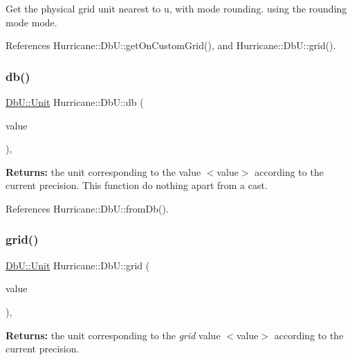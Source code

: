 Get the physical grid unit nearest to {\ttfamily u}, with {\ttfamily mode} rounding. using the rounding mode {\ttfamily mode}. 

References Hurricane\+::\+Db\+U\+::get\+On\+Custom\+Grid(), and Hurricane\+::\+Db\+U\+::grid().

\mbox{\label{group__DbUGroup_gacd77957381fb93fc4203bdca215e0b48}} 
\subsubsection{\texorpdfstring{db()}{db()}}
{\footnotesize\ttfamily \hyperlink{group__DbUGroup_ga4fbfa3e8c89347af76c9628ea06c4146}{Db\+U\+::\+Unit} Hurricane\+::\+Db\+U\+::db (\begin{DoxyParamCaption}\item[{\hyperlink{group__DbUGroup_ga4fbfa3e8c89347af76c9628ea06c4146}{Db\+U\+::\+Unit}}]{value }\end{DoxyParamCaption})\hspace{0.3cm}{\ttfamily [inline]}, {\ttfamily [static]}}

{\bfseries Returns\+:} the unit corresponding to the value {\ttfamily $<$value$>$} according to the current precision. This function do nothing apart from a cast. 

References Hurricane\+::\+Db\+U\+::from\+Db().

\mbox{\label{group__DbUGroup_ga1d4bac6e3b68c8cd44b345de3b425753}} 
\subsubsection{\texorpdfstring{grid()}{grid()}}
{\footnotesize\ttfamily \hyperlink{group__DbUGroup_ga4fbfa3e8c89347af76c9628ea06c4146}{Db\+U\+::\+Unit} Hurricane\+::\+Db\+U\+::grid (\begin{DoxyParamCaption}\item[{double}]{value }\end{DoxyParamCaption})\hspace{0.3cm}{\ttfamily [inline]}, {\ttfamily [static]}}

{\bfseries Returns\+:} the unit corresponding to the {\itshape grid} value {\ttfamily $<$value$>$} according to the current precision. 

